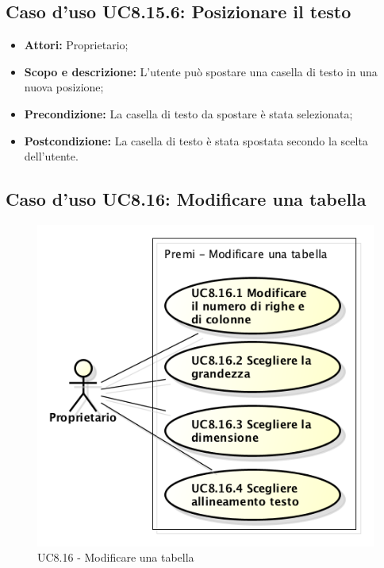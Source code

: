 \subsection{Caso d'uso UC8.15.6: Posizionare il testo}
\begin{itemize}
	\item \textbf{Attori:} Proprietario;
	\item \textbf{Scopo e descrizione:} L'utente può spostare una casella di testo in una nuova posizione;
	\item \textbf{Precondizione:} La casella di testo da spostare è stata selezionata;
	\item \textbf{Postcondizione:} La casella di testo è stata spostata secondo la scelta dell'utente.
\end{itemize}

\subsection{Caso d'uso UC8.16: Modificare una tabella}
\begin{figure}[h] 
	\centering 
	\includegraphics[scale=0.45] {img/UC8.16.png} 
	\caption{UC8.16 - Modificare una tabella} 
\end{figure}


